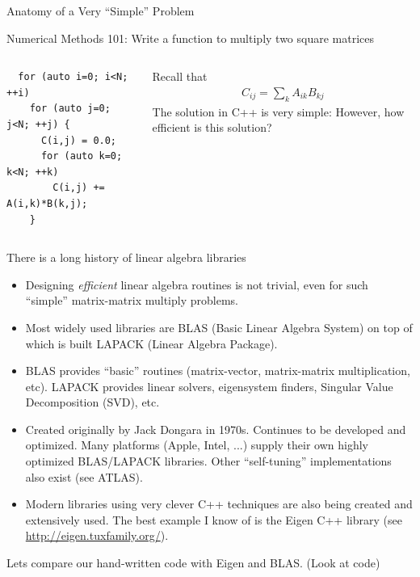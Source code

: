 \documentclass[aspectratio=169]{beamer}
\newcommand{\mypause}{\pause}
\newcommand{\myb}[1]{{\color{blue} {#1}}}
\begin{document}
\begin{frame}[fragile]{Anatomy of a Very ``Simple'' Problem}

  \myb{Numerical Methods 101: Write a function to multiply two square
    matrices}%
  \vskip0.1in%
  \begin{columns}
    \begin{column}{0.4\linewidth}
\begin{verbatim}
  for (auto i=0; i<N; ++i)
    for (auto j=0; j<N; ++j) {
      C(i,j) = 0.0;
      for (auto k=0; k<N; ++k)
        C(i,j) += A(i,k)*B(k,j);
    }
\end{verbatim}
  \end{column}
  
  \begin{column}{0.5\linewidth}
    Recall that
    \begin{align*}
      C_{ij} = \sum_k A_{ik} B_{kj}
    \end{align*}
    \mypause%
    \vskip0.1in%
    The solution in C++ is very simple: However, how efficient is this
    solution?
  \end{column}
\end{columns}  

\end{frame}

\begin{frame}{There is a long history of linear algebra libraries}
  \footnotesize%
  \begin{itemize}
  \item Designing \emph{efficient} linear algebra routines is not
    trivial, even for such ``simple'' matrix-matrix multiply problems.
  \item Most widely used libraries are BLAS (Basic Linear Algebra
    System) on top of which is built LAPACK (Linear Algebra Package).
  \item BLAS provides ``basic'' routines (matrix-vector, matrix-matrix
    multiplication, etc). LAPACK provides linear solvers, eigensystem
    finders, Singular Value Decomposition (SVD), etc.
  \item Created originally by Jack Dongara in 1970s. Continues to be
    developed and optimized. Many platforms (Apple, Intel, ...) supply
    their own highly optimized BLAS/LAPACK libraries. Other
    ``self-tuning'' implementations also exist (see ATLAS).
  \item Modern libraries using very clever C++ techniques are also
    being created and extensively used. The best example I know of is
    the Eigen C++ library (see \url{http://eigen.tuxfamily.org/}).
  \end{itemize}
  \normalsize%
  \myb{Lets compare our hand-written code with Eigen and BLAS. (Look
    at code)}

\end{frame}
\end{document}
